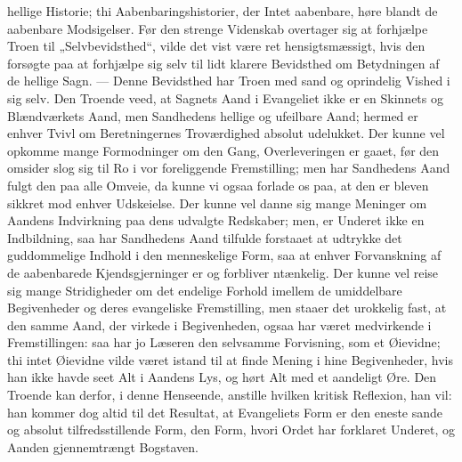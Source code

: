 \documentclass[12pt,a4paper]{book}
\begin{document}
hellige Historie; thi Aabenbaringshistorier, der Intet aabenbare, høre blandt de
aabenbare Modsigelser. Før den strenge Videnskab overtager sig at forhjælpe Troen
til „Selvbevidsthed“, vilde det vist være ret hensigtsmæssigt, hvis den forsøgte
paa at forhjælpe sig selv til lidt klarere Bevidsthed om Betydningen af de hellige
Sagn. --- Denne Bevidsthed har Troen med sand og oprindelig Vished i sig selv. Den
Troende veed, at Sagnets
Aand i Evangeliet ikke er en Skinnets og Blændværkets Aand, men Sandhedens hellige
og ufeilbare Aand; hermed er enhver Tvivl om Beretningernes Troværdighed absolut
udelukket. Der kunne vel opkomme mange Formodninger om den Gang, Overleveringen er
gaaet, før den omsider slog sig til Ro i vor foreliggende Fremstilling; men har
Sandhedens Aand fulgt den paa alle Omveie, da kunne vi ogsaa forlade os paa, at
den er bleven sikkret mod enhver Udskeielse. Der kunne vel danne sig mange
Meninger om Aandens Indvirkning paa dens udvalgte Redskaber; men, er Underet ikke
en Indbildning, saa har Sandhedens Aand tilfulde forstaaet at udtrykke det
guddommelige Indhold i den menneskelige Form, saa at enhver Forvanskning af de
aabenbarede Kjendsgjerninger er og forbliver
ntænkelig. Der kunne vel reise sig mange Stridigheder om det endelige Forhold
imellem de umiddelbare Begivenheder og deres evangeliske Fremstilling, men staaer
det urokkelig fast, at den samme Aand, der virkede i Begivenheden, ogsaa har været
medvirkende i Fremstillingen: saa har jo Læseren den selvsamme Forvisning, som et
Øievidne; thi intet Øievidne vilde været istand til at finde Mening i hine
Begivenheder, hvis han ikke havde seet Alt i Aandens Lys, og hørt Alt med et
aandeligt Øre. Den Troende kan derfor, i denne Henseende, anstille hvilken kritisk
Reflexion, han vil: han kommer dog altid til det Resultat, at Evangeliets Form er
den eneste sande og absolut tilfredsstillende Form, den Form, hvori Ordet har
forklaret Underet, og Aanden gjennemtrængt Bogstaven.
\end{document}
